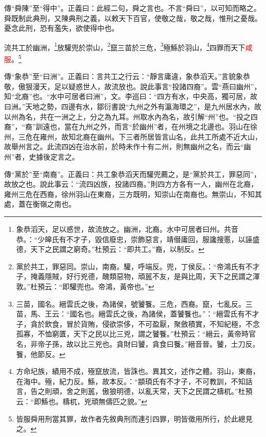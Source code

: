 {\noindent\zhuan{}\fzbyks 傳“舜陳”至“得中”。正義曰：此經二句，舜之言也。不言“舜曰”，以可知而略之。舜既制此典刑，又陳典刑之義，以敕天下百官，使敬之哉，敬之哉，惟刑之憂哉。憂念此刑，恐有濫失，欲使得中也。 \par}

流共工於幽洲，\footnote{象恭滔天，足以惑世，故流放之。幽洲，北裔。水中可居者曰州。共音恭。：“少皞氏有不才子，毀信廢忠，崇飾惡言，靖僣庸回，服讒搜慝，以誣盛德，天下之民謂之窮奇。”杜預云：“即共工。”裔，以制反。}放驩兜於崇山，\footnote{黨於共工，罪惡同。崇山，南裔。驩，呼端反。兜，丁侯反。：“帝鴻氏有不才子，掩義隱賊，好行兇德，醜類惡物，頑嚚不友，是與比周，天下之民謂之渾敦。”杜預云：“即驩兜也。帝鴻，黃帝也。”}竄三苗於三危，\footnote{三苗，國名。縉雲氏之後，為諸侯，號饕餮。三危，西裔。竄，七亂反。三苗，馬、王云：“國名也。縉雲氏之後，為諸侯，蓋饕餮也。”：“縉雲氏有不才子，貪於飲食，冒於貨賄，侵欲崇侈，不可盈厭，聚斂積實，不知紀極，不念孤寡，不恤窮匱，天下之民以比三兇，謂之饕餮。”杜預云：“縉云，黃帝時官名，非帝子孫，故以比三兇也。貪財曰饕，貪食曰餮。”縉音晉。饕，土刀反。餮，他節反。}殛鯀於羽山，\footnote{方命圮族，績用不成，殛竄放流，皆誅也。異其文，述作之體。羽山，東裔，在海中。殛，紀力反。鯀，故本反。：“顓頊氏有不才子，不可教訓，不知話言，告之則頑，舍之則嚚，傲狼明德，以亂天常，天下之民謂之檮杌。”杜預云：“即鯀也。檮杌，兇頑無儔匹之貌。”}四罪而天下\textcolor{red}{咸服}。\footnote{皆服舜用刑當其罪，故作者先敘典刑而連引四罪，明皆徵用所行，於此總見之。}

{\noindent\zhuan{}\fzbyks 傳“象恭”至“曰洲”。正義曰：言共工之行云：“靜言庸違，象恭滔天。”言貌象恭敬，傲狠漫天，足以疑惑世人，故流放也。說此事言“投諸四裔”。雲“燕曰幽州”，知“北裔”也。“水中可居者曰洲”，文。李巡曰：“四方有水，中央高，獨可居，故曰洲。”天地之勢，四邊有水，鄒衍書說“九州之外有瀛海環之”，是九州居水內，故以州為名，共在一洲之上，分之為九耳。州取水內為名，故引解“州”也。“投之四裔”，“裔”訓遠也，當在九州之外，而言“於幽州”者，在州境之北邊也。羽山在徐州，三危在雍州，故知北裔在幽州。下三者所居皆言山名，此共工所處不近大山，故舉州言之。此流四凶在治水前，於時未作十有二州，則無幽州之名，而云“幽州”者，史據後定言之。 \par}

{\noindent\zhuan{}\fzbyks 傳“黨於”至“南裔”。正義曰：共工象恭滔天而驩兜薦之，是“黨於共工，罪惡同”，故放之也。說此事云：“流四凶族，投諸四裔。”則四方方各有一人，幽州在北裔，雍州三危在西裔，徐州羽山在東裔，三方既明，知崇山在南裔也。無崇山，不知其處，蓋在衡嶺之南也。 \par}

